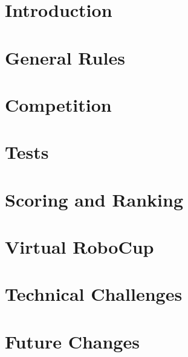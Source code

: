 \documentclass[11pt, twoside, openright, a4paper, chapterprefix]{scrbook}
\begin{document}


\pagestyle{empty}

\tableofcontents
\clearpage

\pagestyle{plain}




\chapter{Introduction}






\chapter{General Rules}


\chapter{Competition}


\chapter{Tests}



\chapter{Scoring and Ranking}


\chapter{Virtual RoboCup}
\label{cha: VRC}


\chapter{Technical Challenges} \label{cha:TechnicalChallenges}
\label{cha: TCHA}


\chapter{Future Changes}
\label{cha: Future}


%


%

%

%



\printabx
\printidx
\end{document}
